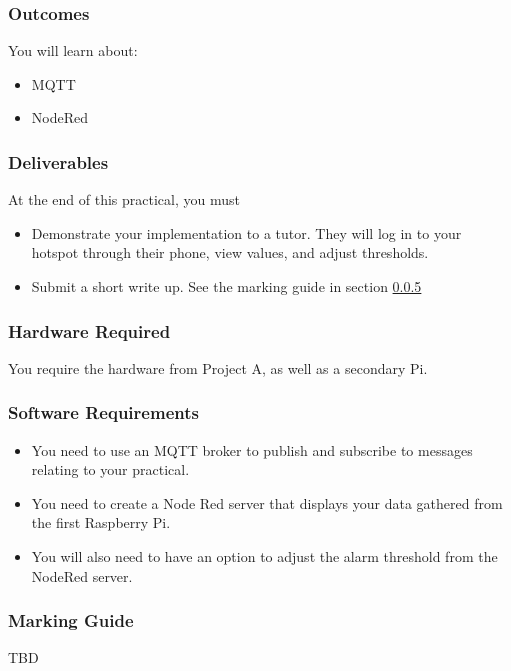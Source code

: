 \subsubsection{Outcomes}
You will learn about:
\begin{itemize}
    \item MQTT
    \item NodeRed
\end{itemize}

\subsubsection{Deliverables}
At the end of this practical, you must
\begin{itemize}
    \item Demonstrate your implementation to a tutor. They will log in to your hotspot through their phone, view values, and adjust thresholds.
    \item Submit a short write up. See the marking guide in section \ref{sec:ProjBMarks}
\end{itemize}

\subsubsection{Hardware Required}
You require the hardware from Project A, as well as a secondary Pi.

\subsubsection{Software Requirements}
\begin{itemize}
    \item You need to use an MQTT broker to publish and subscribe to messages relating to your practical. 
    \item You need to create a Node Red server that displays your data gathered from the first Raspberry Pi. 
    \item You will also need to have an option to adjust the alarm threshold from the NodeRed server.
\end{itemize}

\subsubsection{Marking Guide}
\label{sec:ProjBMarks}
TBD